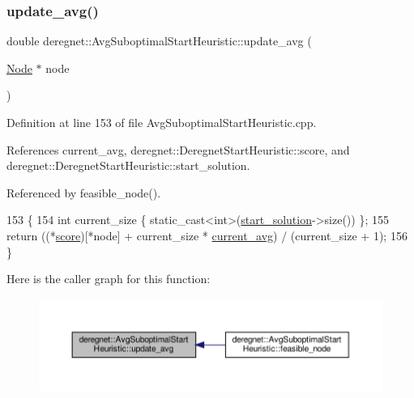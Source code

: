 \subsubsection{\texorpdfstring{update\+\_\+avg()}{update\_avg()}}
{\footnotesize\ttfamily double deregnet\+::\+Avg\+Suboptimal\+Start\+Heuristic\+::update\+\_\+avg (\begin{DoxyParamCaption}\item[{\hyperlink{namespacederegnet_a744bad34f2de9856d36715a445f027f3}{Node} $\ast$}]{node }\end{DoxyParamCaption})\hspace{0.3cm}{\ttfamily [private]}}



Definition at line 153 of file Avg\+Suboptimal\+Start\+Heuristic.\+cpp.



References current\+\_\+avg, deregnet\+::\+Deregnet\+Start\+Heuristic\+::score, and deregnet\+::\+Deregnet\+Start\+Heuristic\+::start\+\_\+solution.



Referenced by feasible\+\_\+node().


\begin{DoxyCode}
153                                                          \{
154     \textcolor{keywordtype}{int} current\_size \{ \textcolor{keyword}{static\_cast<}\textcolor{keywordtype}{int}\textcolor{keyword}{>}(\hyperlink{classderegnet_1_1DeregnetStartHeuristic_a7450e11ca0a265b055f95e7832b65e2f}{start\_solution}->size()) \};
155     \textcolor{keywordflow}{return} ((*\hyperlink{classderegnet_1_1DeregnetStartHeuristic_ae03300e79482975e98f95cba19ad32b0}{score})[*node] + current\_size * \hyperlink{classderegnet_1_1AvgSuboptimalStartHeuristic_a5c07fde8d2f92daeb4cc33f85e8bf1e2}{current\_avg}) / (current\_size + 1);
156 \}
\end{DoxyCode}
Here is the caller graph for this function\+:\nopagebreak
\begin{figure}[H]
\begin{center}
\leavevmode
\includegraphics[width=350pt]{classderegnet_1_1AvgSuboptimalStartHeuristic_a29659ab4864fddd2c226da7e1ada22ef_icgraph}
\end{center}
\end{figure}



